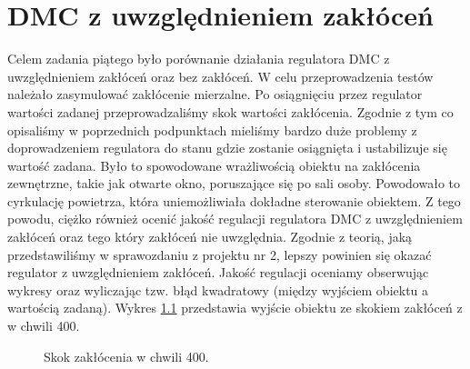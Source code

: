 \chapter{DMC z uwzględnieniem zakłóceń}
Celem zadania piątego było porównanie działania regulatora DMC z uwzględnieniem
zakłóceń oraz bez zakłóceń. W celu przeprowadzenia testów należało zasymulować
zakłócenie mierzalne. Po osiągnięciu przez regulator wartości zadanej
przeprowadzaliśmy skok wartości zakłócenia. Zgodnie z tym co opisaliśmy w
poprzednich podpunktach mieliśmy bardzo duże problemy z doprowadzeniem regulatora
do stanu gdzie zostanie osiągnięta i ustabilizuje się wartość zadana. Było to
spowodowane wrażliwością obiektu na zakłócenia zewnętrzne, takie jak otwarte okno,
poruszające się po sali osoby. Powodowało to cyrkulację powietrza, która
uniemożliwiała dokładne sterowanie obiektem. Z tego powodu, ciężko również ocenić
jakość regulacji regulatora DMC z uwzględnieniem zakłóceń oraz tego który zakłóceń
nie uwzględnia. Zgodnie z teorią, jaką przedstawiliśmy w sprawozdaniu z
projektu nr 2, lepszy powinien się okazać regulator z uwzględnieniem zakłóceń.
Jakość regulacji oceniamy obserwując wykresy oraz wyliczając tzw. błąd kwadratowy
(między wyjściem obiektu a wartością zadaną). Wykres \ref{fig:zakl} przedstawia
wyjście obiektu ze skokiem zakłóceń z w chwili 400.

\begin{figure}[tb]
\centering
{}
\caption{Skok zakłócenia w chwili 400.}
\label{fig:zakl}
\end{figure}
